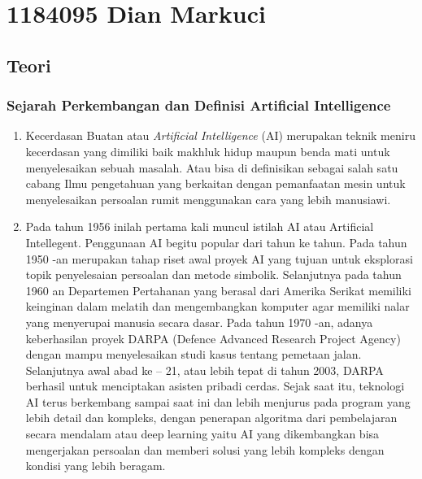 

\maketitle

\section{1184095 Dian Markuci}
\subsection{Teori}
	\subsubsection{Sejarah Perkembangan dan Definisi Artiﬁcial Intelligence}      
	
	\begin{enumerate}
	    \item  Kecerdasan Buatan atau \textit{Artificial Intelligence} (AI) merupakan teknik meniru kecerdasan yang dimiliki baik makhluk hidup maupun benda mati untuk menyelesaikan sebuah masalah. Atau bisa di definisikan sebagai salah satu cabang Ilmu pengetahuan yang berkaitan dengan pemanfaatan mesin untuk menyelesaikan persoalan rumit menggunakan cara yang lebih manusiawi.
	    
	    \item  Pada tahun 1956 inilah pertama kali muncul istilah AI atau Artificial Intellegent. Penggunaan AI begitu popular dari tahun ke tahun. Pada tahun 1950 -an merupakan tahap riset awal proyek AI yang tujuan untuk eksplorasi topik penyelesaian persoalan dan metode simbolik. Selanjutnya pada tahun 1960 an Departemen Pertahanan yang berasal dari Amerika Serikat memiliki keinginan dalam melatih dan mengembangkan komputer agar memiliki nalar yang menyerupai manusia secara dasar. Pada tahun 1970 -an, adanya keberhasilan proyek DARPA (Defence Advanced Research Project Agency) dengan mampu menyelesaikan studi kasus tentang pemetaan jalan. Selanjutnya awal abad ke – 21, atau lebih tepat di tahun 2003, DARPA berhasil untuk menciptakan asisten pribadi cerdas. Sejak saat itu, teknologi AI terus berkembang sampai saat ini dan lebih menjurus pada program yang lebih detail dan kompleks, dengan penerapan algoritma dari pembelajaran secara mendalam atau deep learning yaitu AI yang dikembangkan bisa mengerjakan persoalan dan memberi solusi yang lebih kompleks dengan kondisi yang lebih beragam.
	\end{enumerate}
    

